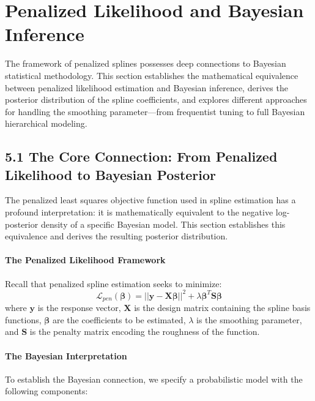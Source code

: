\documentclass[11pt, a4paper]{article}
\begin{document}
\newpage
\section{Penalized Likelihood and Bayesian Inference}
The framework of penalized splines possesses deep connections to Bayesian statistical methodology. This section establishes the mathematical equivalence between penalized likelihood estimation and Bayesian inference, derives the posterior distribution of the spline coefficients, and explores different approaches for handling the smoothing parameter—from frequentist tuning to full Bayesian hierarchical modeling.

\subsection{5.1 The Core Connection: From Penalized Likelihood to Bayesian Posterior}
The penalized least squares objective function used in spline estimation has a profound interpretation: it is mathematically equivalent to the negative log-posterior density of a specific Bayesian model. This section establishes this equivalence and derives the resulting posterior distribution.

\paragraph{The Penalized Likelihood Framework}
Recall that penalized spline estimation seeks to minimize:
\[ \mathcal{L}_{pen}(\boldsymbol{\beta}) = ||\mathbf{y} - \mathbf{X}\boldsymbol{\beta}||^2 + \lambda \boldsymbol{\beta}^T \mathbf{S} \boldsymbol{\beta} \]
where $\mathbf{y}$ is the response vector, $\mathbf{X}$ is the design matrix containing the spline basis functions, $\boldsymbol{\beta}$ are the coefficients to be estimated, $\lambda$ is the smoothing parameter, and $\mathbf{S}$ is the penalty matrix encoding the roughness of the function.

\paragraph{The Bayesian Interpretation}
To establish the Bayesian connection, we specify a probabilistic model with the following components:
\end{document}
